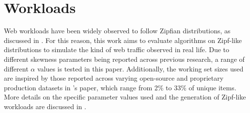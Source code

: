 
\section{Workloads}\label{sec: workloads}

Web workloads have been widely observed to follow Zipfian distributions, as discussed in . For this reason, this work aims to evaluate algorithms on Zipf-like distributions to simulate the kind of web traffic observed in real life. Due to different skewness parameters being reported across previous research, a range of different $\alpha$ values is tested in this paper. Additionally, the working set sizes used are inspired by those reported across varying open-source and proprietary production datasets in \citeauthor{sieve}'s paper, which range from 2\% to 33\% of unique items. More details on the specific parameter values used and the generation of Zipf-like workloads are discussed in .

